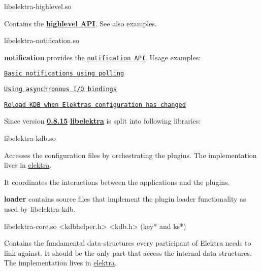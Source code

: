 
\begin{DoxyCode}
libelektra-highlevel.so
\end{DoxyCode}


Contains the {\bfseries \hyperlink{src_libs_highlevel_README_md}{highlevel A\+PI}}. See also examples.


\begin{DoxyCode}
libelektra-notification.so
\end{DoxyCode}


{\bfseries notification} provides the \href{https://doc.libelektra.org/api/latest/html/group__kdbnotification.html}{\tt notification A\+PI}. Usage examples\+:


\begin{DoxyItemize}
\item \href{https://www.libelektra.org/examples/notificationpolling}{\tt Basic notifications using polling}
\item \href{https://www.libelektra.org/examples/notificationasync}{\tt Using asynchronous I/O bindings}
\item \href{https://www.libelektra.org/examples/notificationreload}{\tt Reload K\+DB when Elektra\textquotesingle{}s configuration has changed}
\end{DoxyItemize}

Since version {\bfseries \hyperlink{doc_decisions_library_split_md}{0.8.15}} {\bfseries \hyperlink{md_src_libs_elektra_README_src_libs_elektra_README_md}{libelektra}} is split into following libraries\+:

 


\begin{DoxyCode}
libelektra-kdb.so
\end{DoxyCode}


Accesses the configuration files by orchestrating the plugins. The implementation lives in \hyperlink{md_src_libs_elektra_README_src_libs_elektra_README_md}{elektra}.

It coordinates the interactions between the applications and the plugins.

{\bfseries loader} contains source files that implement the plugin loader functionality as used by {\ttfamily libelektra-\/kdb}.


\begin{DoxyCode}
libelektra-core.so
<kdbhelper.h>
<kdb.h> (key* and ks*)
\end{DoxyCode}


Contains the fundamental data-\/structures every participant of Elektra needs to link against. It should be the only part that access the internal data structures. The implementation lives in \hyperlink{md_src_libs_elektra_README_src_libs_elektra_README_md}{elektra}.


